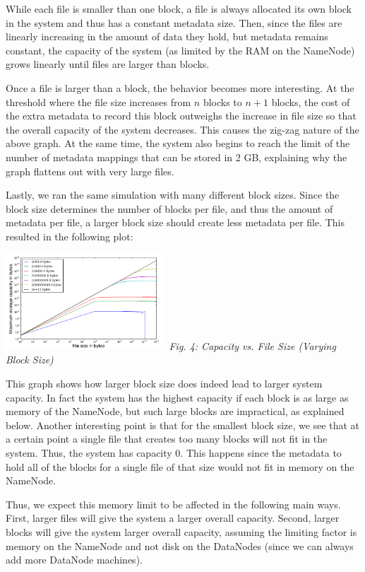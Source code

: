 \documentclass[11pt, a4paper]{article}
\begin{document}
\begin{multicols*}{2}
While each file is smaller than one block, a file is always allocated its own block in the system and thus has a constant metadata size. Then, since the files are linearly increasing in the amount of data they hold, but metadata remains constant, the capacity of the system (as limited by the RAM on the NameNode) grows linearly until files are larger than blocks. 

Once a file is larger than a block, the behavior becomes more interesting. At the threshold where the file size increases from $n$ blocks to $n+1$ blocks, the cost of the extra metadata to record this block outweighs the increase in file size so that the overall capacity of the system decreases. This causes the zig-zag nature of the above graph. At the same time, the system also begins to reach the limit of the number of metadata mappings that can be stored in 2 GB, explaining why the graph flattens out with very large files. 

Lastly, we ran the same simulation with many different block sizes.  Since the block size determines the number of blocks per file, and thus the amount of metadata per file, a larger block size should create less metadata per file. This resulted in the following plot:
\begin{center}
	\includegraphics[keepaspectratio=true, width=0.45\textwidth]{variableBlockSize}	
	\textit{Fig. 4: Capacity vs. File Size (Varying Block Size)}
\end{center}

This graph shows how larger block size does indeed lead to larger system capacity. In fact the system has the highest capacity if each block is as large as memory of the NameNode, but such large blocks are impractical, as explained below. Another interesting point is that for the smallest block size, we see that at a certain point a single file that creates too many blocks will not fit in the system. Thus, the system has capacity 0. This happens since the metadata to hold all of the blocks for a single file of that size would not fit in memory on the NameNode. 

Thus, we expect this memory limit to be affected in the following main ways. First, larger files will give the system a larger overall capacity. Second, larger blocks will give the system larger overall capacity, assuming the limiting factor is memory on the NameNode and not disk on the DataNodes (since we can always add more DataNode machines).


\end{multicols*}
\end{document}
